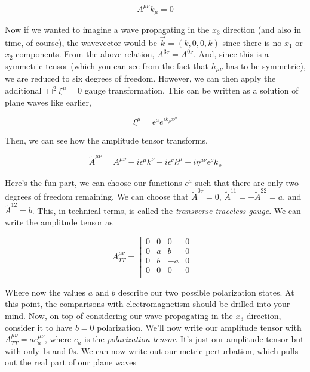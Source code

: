 \documentclass{article}
\newcommand{\mn}{_{\mu\nu}}
\newcommand{\umn}{^{\mu\nu}}
\begin{document}
\begin{equation}
    A\umn k_\mu = 0
\end{equation}

Now if we wanted to imagine a wave propagating in the $x_3$ direction (and also in time, of course), the wavevector would be $\vec{k} = (k,0,0,k)$ since there is no $x_1$ or $x_2$ components. From the above relation, $A^{3\nu} = A^{0\nu}$. And, since this is a symmetric tensor (which you can see from the fact that $h\mn$ has to be symmetric), we are reduced to six degrees of freedom. However, we can then apply the additional $\Box^2\xi^\mu=0$ gauge transformation. This can be written as a solution of plane waves like earlier,

\begin{equation}
    \xi^\mu = \epsilon^\mu e^{ik_\rho x^\rho}
\end{equation}

Then, we can see how the amplitude tensor transforms,

\begin{equation}
    \tilde{A}\umn = A\umn - i\epsilon^\mu k^\nu - i\epsilon^\nu k^\mu +i\eta\umn\epsilon^\rho k_\rho
\end{equation}

Here's the fun part, we can choose our functions $\epsilon^\mu$ such that there are only two degrees of freedom remaining. We can choose that $\tilde{A}^{0\nu}=0$, $\tilde{A}^{11}=-\tilde{A}^{22}=a$, and $\tilde{A}^{12}=b$. This, in technical terms, is called the \textit{transverse-traceless gauge}. We can write the amplitude tensor as


\begin{equation}
    A_{TT}\umn=\begin{bmatrix}
    0 & 0 & 0 & 0 \\
    0 & a & b & 0 \\
    0 & b & -a & 0 \\
    0 & 0 & 0 & 0 \\
    \end{bmatrix}
\end{equation}

Where now the values $a$ and $b$ describe our two possible polarization states. At this point, the comparisons with electromagnetism should be drilled into your mind. Now, on top of considering our wave propagating in the $x_3$ direction, consider it to have $b=0$ polarization. We'll now write our amplitude tensor with $A_{TT}\umn = ae_a\umn$, where $e_a$ is the \textit{polarization tensor}. It's just our amplitude tensor but with only 1s and 0s. We can now write out our metric perturbation, which pulls out the real part of our plane waves
\end{document}
